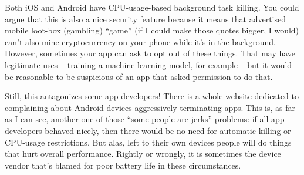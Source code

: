 Both iOS and Android have CPU-usage-based background task killing. You could argue that this is also a nice security feature because it means that advertised mobile loot-box (gambling) ``game'' (if I could make those quotes bigger, I would) can't also mine cryptocurrency on your phone while it's in the background. However, sometimes your app can ask to opt out of these things. That may have legitimate uses -- training a machine learning model, for example -- but it would be reasonable to be suspicious of an app that asked permission to do that.

Still, this antagonizes some app developers! There is a whole website dedicated to complaining about Android devices aggressively terminating apps. This is, as far as I can see, another one of those ``some people are jerks'' problems: if all app developers behaved nicely, then there would be no need for automatic killing or CPU-usage restrictions. But alas, left to their own devices people will do things that hurt overall performance. Rightly or wrongly, it is sometimes the device vendor that's blamed for poor battery life in these circumstances. 




